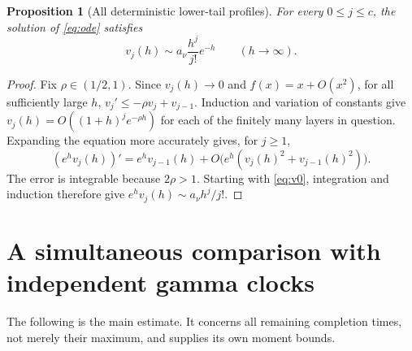 \documentclass[11pt]{article}
\newtheorem{proposition}[theorem]{Proposition}
\theoremstyle{remark}\newtheorem{remark}[theorem]{Remark}
\begin{document}
\begin{proposition}[All deterministic lower-tail profiles]\label{prop:profiles}
For every $0\le j\le c$, the solution of \eqref{eq:ode} satisfies
\[
 v_j(h)\sim a_\nu\frac{h^j}{j!}e^{-h}\qquad(h\to\infty).
\]
\end{proposition}
\begin{proof}
Fix $\rho\in(1/2,1)$. Since $v_j(h)\to0$ and $f(x)=x+O(x^2)$,
for all sufficiently large $h$,
$v_j'\le-\rho v_j+v_{j-1}$. Induction and variation of constants give
$v_j(h)=O((1+h)^j e^{-\rho h})$ for each of the finitely many layers in
question. Expanding the equation more accurately gives, for $j\ge1$,
\[
 (e^h v_j(h))'=e^h v_{j-1}(h)
       +O\bigl(e^h(v_j(h)^2+v_{j-1}(h)^2)\bigr).
\]
The error is integrable because $2\rho>1$. Starting with
\eqref{eq:v0}, integration and induction therefore give
$e^h v_j(h)\sim a_\nu h^j/j!$.
\end{proof}

\section{A simultaneous comparison with independent gamma clocks}
The following is the main estimate. It concerns all remaining completion
times, not merely their maximum, and supplies its own moment bounds.
\end{document}
